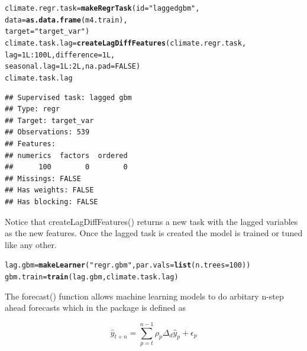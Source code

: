 \documentclass{article}\usepackage[]{graphicx}\usepackage[]{color}
\makeatletter
\newcommand{\hlnum}[1]{\textcolor[rgb]{0.686,0.059,0.569}{#1}}%
\newcommand{\hlstr}[1]{\textcolor[rgb]{0.192,0.494,0.8}{#1}}%
\newcommand{\hlopt}[1]{\textcolor[rgb]{0,0,0}{#1}}%
\newcommand{\hlstd}[1]{\textcolor[rgb]{0.345,0.345,0.345}{#1}}%
\newcommand{\hlkwb}[1]{\textcolor[rgb]{0.69,0.353,0.396}{#1}}%
\newcommand{\hlkwc}[1]{\textcolor[rgb]{0.333,0.667,0.333}{#1}}%
\newcommand{\hlkwd}[1]{\textcolor[rgb]{0.737,0.353,0.396}{\textbf{#1}}}%
\newenvironment{kframe}{%
 \def\at@end@of@kframe{}%
 \ifinner\ifhmode%
  \def\at@end@of@kframe{\end{minipage}}%
  \begin{minipage}{\columnwidth}%
 \fi\fi%
 \def\FrameCommand##1{\hskip\@totalleftmargin \hskip-\fboxsep
 \colorbox{shadecolor}{##1}\hskip-\fboxsep
     \hskip-\linewidth \hskip-\@totalleftmargin \hskip\columnwidth}%
 \MakeFramed {\advance\hsize-\width
   \@totalleftmargin\z@ \linewidth\hsize
   \@setminipage}}%
 {\par\unskip\endMakeFramed%
 \at@end@of@kframe}
\newenvironment{knitrout}{}{} %
\theoremstyle{definition}
\newcommand\code{\@codex}
\def\@codex#1{{\normalfont\ttfamily\hyphenchar\font=-1 #1}}
\makeatother
\begin{document}
\begin{knitrout}
\color{fgcolor}\begin{kframe}
\begin{alltt}
\hlstd{climate.regr.task} \hlkwb{=} \hlkwd{makeRegrTask}\hlstd{(}\hlkwc{id} \hlstd{=} \hlstr{"lagged gbm"}\hlstd{,}
                                 \hlkwc{data} \hlstd{=} \hlkwd{as.data.frame}\hlstd{(m4.train),}
                                 \hlkwc{target} \hlstd{=} \hlstr{"target_var"}\hlstd{)}
\hlstd{climate.task.lag} \hlkwb{=} \hlkwd{createLagDiffFeatures}\hlstd{(climate.regr.task,}
                                         \hlkwc{lag} \hlstd{=} \hlnum{1L}\hlopt{:}\hlnum{100L}\hlstd{,} \hlkwc{difference} \hlstd{=} \hlnum{1L}\hlstd{,}
                                         \hlkwc{seasonal.lag} \hlstd{=} \hlnum{1L}\hlopt{:}\hlnum{2L}\hlstd{,} \hlkwc{na.pad}\hlstd{=}\hlnum{FALSE}\hlstd{)}
\hlstd{climate.task.lag}
\end{alltt}
\begin{verbatim}
## Supervised task: lagged gbm
## Type: regr
## Target: target_var
## Observations: 539
## Features:
## numerics  factors  ordered 
##      100        0        0 
## Missings: FALSE
## Has weights: FALSE
## Has blocking: FALSE
\end{verbatim}
\end{kframe}
\end{knitrout}

Notice that \code{createLagDiffFeatures()} returns a new task with the lagged variables as the new features. Once the lagged task is created the model is trained or tuned like any other.

\begin{knitrout}
\color{fgcolor}\begin{kframe}
\begin{alltt}
\hlstd{lag.gbm} \hlkwb{=} \hlkwd{makeLearner}\hlstd{(}\hlstr{"regr.gbm"}\hlstd{,} \hlkwc{par.vals} \hlstd{=} \hlkwd{list}\hlstd{(}\hlkwc{n.trees} \hlstd{=} \hlnum{100}\hlstd{))}
\hlstd{gbm.train} \hlkwb{=} \hlkwd{train}\hlstd{(lag.gbm, climate.task.lag)}
\end{alltt}
\end{kframe}
\end{knitrout}

The \code{forecast()} function allows machine learning models to do arbitary n-step ahead forecasts which in the package is defined as

\begin{equation}
\hat{y}_{t+n} = \sum_{p=t}^{n-1} \rho_p \Delta_d \hat{y}_{p} + \epsilon_{p}
\end{equation}
\end{document}
